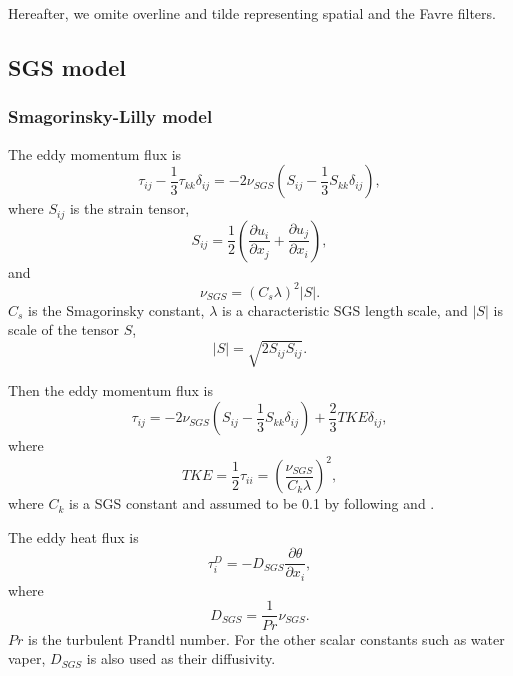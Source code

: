 Hereafter, we omite overline and tilde representing spatial and the Favre filters.

\subsection{SGS model}
\subsubsection{Smagorinsky-Lilly model}
The eddy momentum flux is
\begin{equation}
  \tau_{ij} - \frac{1}{3}\tau_{kk}\delta_{ij} = -2\nu_{SGS}\left(S_{ij}-\frac{1}{3}S_{kk}\delta_{ij}\right),
\end{equation}
where $S_{ij}$ is the strain tensor,
\begin{equation}
  S_{ij} = \frac{1}{2}\left(\frac{\partial u_i}{\partial x_j} + \frac{\partial u_j}{\partial x_i}\right),
  \label{eq:strain tensor}
\end{equation}
and
\begin{equation}
  \nu_{SGS} = \left(C_s\lambda\right)^2 \left|S\right|.
\end{equation}
$C_s$ is the Smagorinsky constant,
$\lambda$ is a characteristic SGS length scale,
and $\left|S\right|$ is scale of the tensor $S$,
\begin{equation}
  \left|S\right| = \sqrt{2S_{ij}S_{ij}}.
  \label{eq:|S|}
\end{equation}

Then the eddy momentum flux is
\begin{equation}
  \tau_{ij} = -2\nu_{SGS}\left(S_{ij}-\frac{1}{3}S_{kk}\delta_{ij}\right)
             + \frac{2}{3} TKE\delta_{ij},
  \label{eq:tau}
\end{equation}
where
\begin{equation}
  TKE = \frac{1}{2}\tau_{ii}
   = \left(\frac{\nu_{SGS}}{C_k\lambda}\right)^2,
   \label{eq:tke}
\end{equation}
where $C_k$ is a SGS constant and assumed to be 0.1 by following \citet{Deardorff_1980} and \citet{Moeng_Wynggard_1988}.


The eddy heat flux is
\begin{equation}
  \tau^D_i = -D_{SGS} \frac{\partial \theta}{\partial x_i},
  \label{eq:tau*}
\end{equation}
where
\begin{equation}
  D_{SGS} = \frac{1}{Pr}\nu_{SGS}.
\end{equation}
$Pr$ is the turbulent Prandtl number.
For the other scalar constants such as water vaper,
$D_{SGS}$ is also used as their diffusivity.

